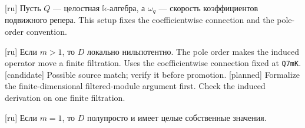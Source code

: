 [ru]
  {Пусть \(Q\) — целостная \(\mathbb{k}\)-алгебра, а \(\omega_q\) — скорость коэффициентов подвижного репера.}
  {This setup fixes the coefficientwise connection and the pole-order convention.}

[ru]
  {Если \(m>1\), то \(D\) локально нильпотентно.}
  {The pole order makes the induced operator move a finite filtration.}
  {Uses the coefficientwise connection fixed at \texttt{Q7mK}.}
[candidate]
  {Possible source match; verify it before promotion.}
[planned]
  {Formalize the finite-dimensional filtered-module argument first.}
  {Check the induced derivation on one finite filtration.}

[ru]
  {Если \(m=1\), то \(D\) полупросто и имеет целые собственные значения.}
